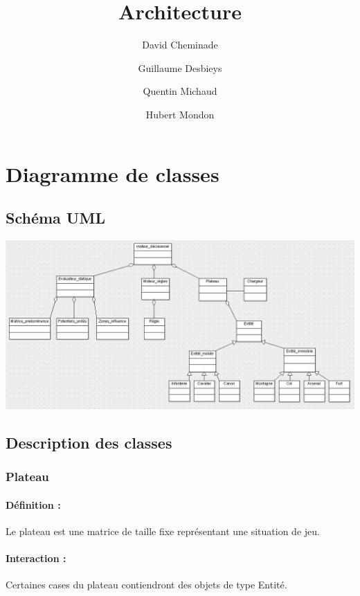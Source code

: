 \documentclass[12pt]{article}
\title{Architecture}
\author{
	David Cheminade
	\and
	Guillaume Desbieys
	\and
	Quentin Michaud
	\and
	Hubert Mondon
}
\date{}
\begin{document}
 
	\maketitle{}                             

	\section{Diagramme de classes}    

		\subsection{Schéma UML}

			\includegraphics[scale=0.4]{images/diag_classes.jpg}

			\clearpage

		\subsection{Description des classes}

			\subsubsection{Plateau}
			
				\paragraph{Définition :}

				Le plateau est une matrice de taille fixe représentant une situation de jeu.

				\paragraph{Interaction :}

				Certaines cases du plateau contiendront des objets de type Entité.
				
\end{document}
